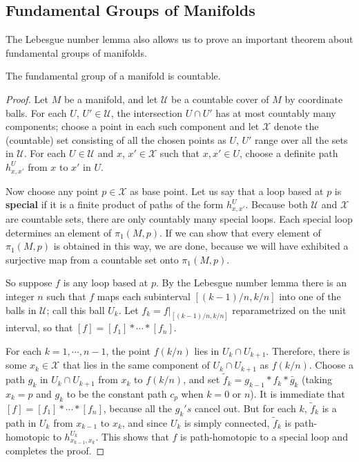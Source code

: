 \subsection{Fundamental Groups of Manifolds}
The Lebesgue number lemma also allows us to prove an important theorem about fundamental groups of manifolds.
\begin{theorem}
The fundamental group of a manifold is countable.
\end{theorem}
\begin{proof}
Let $M$ be a manifold, and let $\mathcal{U}$ be a countable cover of $M$ by coordinate balls. For each $U$, $U'\in\mathcal{U}$, the intersection $U\cap U'$ has at most countably many components; choose a point in each such component and let $\mathcal{X}$ denote the (countable) set consisting of all the chosen points as $U$, $U'$ range over all the sets in $\mathcal{U}$. For each $U\in\mathcal{U}$ and $x$, $x'\in\mathcal{X}$ such that $x,x'\in U$, choose a definite path $h^U_{x,x'}$ from $x$ to $x'$ in $U$.\par
Now choose any point $p\in\mathcal{X}$ as base point. Let us say that a loop based at $p$ is \textbf{special} if it is a finite product of paths of the form $h^U_{x,x'}$. Because both $\mathcal{U}$ and $\mathcal{X}$ are countable sets, there are only countably many special loops. Each special loop determines an element of $\pi_1(M,p)$. If we can show that every element of $\pi_1(M,p)$ is obtained in this way, we are done, because we will have exhibited a surjective map from a countable set onto $\pi_1(M,p)$.\par
So suppose $f$ is any loop based at $p$. By the Lebesgue number lemma there is an integer $n$ such that $f$ maps each subinterval $[(k-1)/n,k/n]$ into one of the balls in $\mathcal{U}$; call this ball $U_k$. Let $f_k=f|_{[(k-1)/n,k/n]}$ reparametrized on the unit interval, so that $[f]=[f_1]\ast\cdots\ast[f_n]$.\par
For each $k=1,\cdots,n-1$, the point $f(k/n)$ lies in $U_k\cap U_{k+1}$. Therefore, there is some $x_k\in\mathcal{X}$ that lies in the same component of $U_k\cap U_{k+1}$ as $f(k/n)$. Choose a path $g_k$ in $U_k\cap U_{k+1}$ from $x_k$ to $f(k/n)$, and set $\widetilde{f}_k=g_{k-1}\ast f_k\ast \bar{g}_k$ (taking $x_k=p$ and $g_k$ to be the constant path $c_p$ when $k=0$ or $n$). It is immediate that $[f]=[f_1]\ast\cdots\ast[f_n]$, because all the $g_k's$ cancel out. But for each $k$, $\widetilde{f}_k$ is a path in $U_k$ from $x_{k-1}$ to $x_k$, and since $U_k$ is simply connected, $\widetilde{f}_k$ is path-homotopic to $h^{U_k}_{x_{k-1},x_k}$. This shows that $f$ is path-homotopic to a special loop and completes the proof.

\end{proof}
